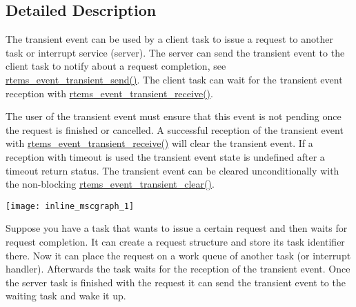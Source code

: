 \subsection{Detailed Description}
The transient event can be used by a client task to issue a request to another task or interrupt service (server). The server can send the transient event to the client task to notify about a request completion, see \mbox{\hyperlink{group__ClassicEventTransient_gab2d8a49e579d5eb1f71f499230ed9808}{rtems\+\_\+event\+\_\+transient\+\_\+send()}}. The client task can wait for the transient event reception with \mbox{\hyperlink{group__ClassicEventTransient_ga9a9d65005be8b07ee557eef07de4b501}{rtems\+\_\+event\+\_\+transient\+\_\+receive()}}.

The user of the transient event must ensure that this event is not pending once the request is finished or cancelled. A successful reception of the transient event with \mbox{\hyperlink{group__ClassicEventTransient_ga9a9d65005be8b07ee557eef07de4b501}{rtems\+\_\+event\+\_\+transient\+\_\+receive()}} will clear the transient event. If a reception with timeout is used the transient event state is undefined after a timeout return status. The transient event can be cleared unconditionally with the non-\/blocking \mbox{\hyperlink{group__ClassicEventTransient_ga5fd6be98f54e9aa634dbb203902b8676}{rtems\+\_\+event\+\_\+transient\+\_\+clear()}}.


\begin{DoxyImageNoCaption}
  \mbox{\texttt{[image: inline\_mscgraph\_1]}}
\end{DoxyImageNoCaption}


Suppose you have a task that wants to issue a certain request and then waits for request completion. It can create a request structure and store its task identifier there. Now it can place the request on a work queue of another task (or interrupt handler). Afterwards the task waits for the reception of the transient event. Once the server task is finished with the request it can send the transient event to the waiting task and wake it up.


